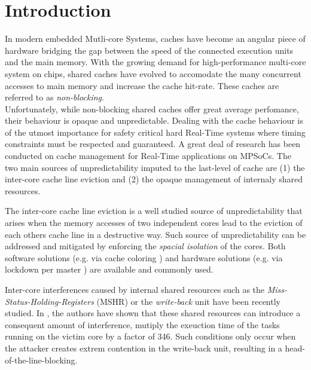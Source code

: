\section{Introduction}
    In modern embedded Mutli-core Systems, caches have become an angular piece of hardware bridging the gap between the speed of the connected execution units and the main memory. With the growing demand for high-performance multi-core system on chips, shared caches have evolved to accomodate the many concurrent accesses to main memory and increase the cache hit-rate. These caches are referred to as \emph{non-blocking}.\\

    Unfortunately, while non-blocking shared caches offer great average perfomance, their behaviour is opaque and unpredictable. Dealing with the cache behaviour is of the utmost importance for safety critical hard Real-Time systems where timing constraints must be respected and guaranteed. A great deal of research has been conducted on cache management for Real-Time applications on MPSoCs. The two main sources of unpredictability imputed to the last-level of cache are (1) the inter-core cache line eviction and (2) the opaque management of internaly shared resources.

    The inter-core cache line eviction is a well studied source of unpredictability that arises when the memory accesses of two independent cores lead to the eviction of each others cache line in a destructive way. Such source of unpredictability can be addressed and mitigated by enforcing the \emph{spacial isolation} of the cores. Both software solutions (e.g. via cache coloring \cite{}) and hardware solutions (e.g. via lockdown per master \cite{Giovani_cahe_partitioning_survey}) are available and commonly used.

    Inter-core interferences caused by internal shared resources such as the \emph{Miss-Status-Holding-Registers} (MSHR) or the \emph{write-back} unit  have been recently studied. In \cite{Valsan2017AddressingIC, Heechul_DDOS_attacks_on_shared_cache}, the authors have shown that these shared resources can introduce a consequent amount of interference, mutiply the exeuction time of the tasks running on the victim core by a factor of 346. Such conditions only occur when the attacker creates extrem contention in the write-back unit, resulting in a head-of-the-line-blocking.\\

